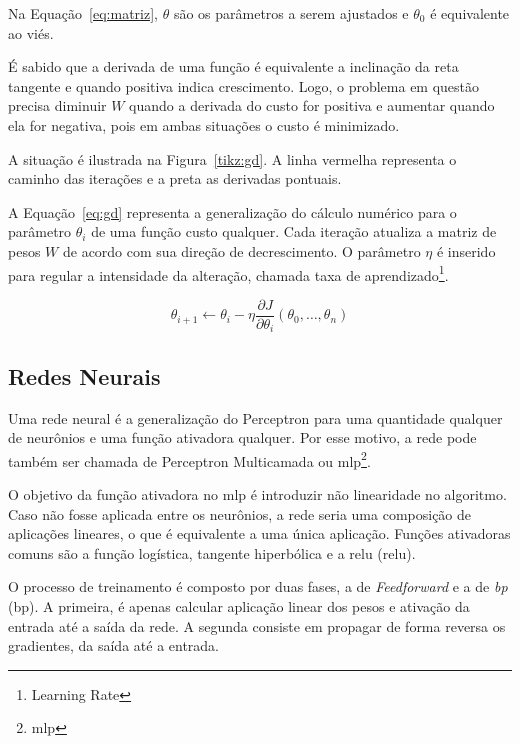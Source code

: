 Na Equação~\ref{eq:matriz}, $\theta$ são os parâmetros a serem ajustados e
$\theta_0$ é equivalente ao viés.

É sabido que a derivada de uma função é equivalente a inclinação da reta
tangente e quando positiva indica crescimento.  Logo, o problema em questão
precisa diminuir $W$ quando a derivada do custo for positiva e aumentar quando
ela for negativa, pois em ambas situações o custo é minimizado.

A situação é ilustrada na Figura~\ref{tikz:gd}. A linha vermelha
representa o caminho das iterações e a preta as derivadas pontuais.



A Equação~\ref{eq:gd} representa a generalização do cálculo numérico para o
parâmetro $\theta_i$ de uma função custo qualquer. Cada
iteração atualiza a matriz de pesos $W$ de acordo com sua direção de
decrescimento.  O parâmetro $\eta$ é inserido para regular a intensidade da
alteração, chamada taxa de aprendizado\footnote{Learning Rate}.

\begin{equation}
	\theta_{i+1} \leftarrow \theta_i-\eta \frac{\partial J}{\partial \theta_i}(\theta_0, \ldots, \theta_n)
	\label{eq:gd}
\end{equation}

\subsection{Redes Neurais}

Uma rede neural é a generalização do Perceptron para uma quantidade qualquer de
neurônios e uma função ativadora qualquer. Por esse motivo, a rede pode também ser
chamada de Perceptron Multicamada ou \acrshort{mlp}\footnote{\acrlong{mlp}}.

O objetivo da função ativadora no \acrshort{mlp} é introduzir não linearidade no
algoritmo. Caso não fosse aplicada entre os neurônios, a rede seria uma composição
de aplicações lineares, o que é equivalente a uma única aplicação. Funções
ativadoras comuns são a função logística, tangente hiperbólica e a
\acrlong{relu} (\acrshort{relu}).



O processo de treinamento é composto por duas fases, a de \emph{Feedforward} e
a de \emph{\acrlong{bp}} (\acrshort{bp}).  A primeira, é apenas calcular aplicação linear
dos pesos e ativação da entrada até a saída da rede. A segunda consiste em
propagar de forma reversa os gradientes, da saída até a entrada.

